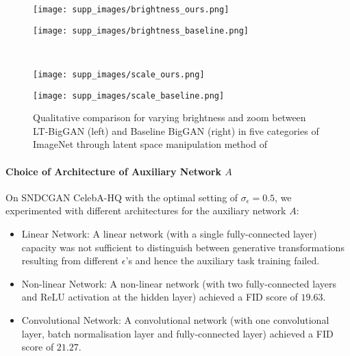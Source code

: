 \documentclass[10pt,twocolumn,letterpaper]{article}
\begin{document}
\begin{figure*}[t]
\centering
    \begin{minipage}{.48\textwidth}
    \texttt{[image: supp\_images/brightness\_ours.png]}
    \end{minipage}\hspace{0.05cm}
    \begin{minipage}{.48\textwidth}
    \texttt{[image: supp\_images/brightness\_baseline.png]}
    \end{minipage}\\
    \begin{minipage}{.48\textwidth}
    \texttt{[image: supp\_images/scale\_ours.png]}
    \end{minipage}\hspace{0.05cm}
    \begin{minipage}{.48\textwidth}
    \texttt{[image: supp\_images/scale\_baseline.png]}
    \end{minipage}
    \caption{\footnotesize{Qualitative comparison for varying brightness and zoom between LT-BigGAN (left) and Baseline BigGAN (right) in five categories of ImageNet through latent space manipulation method of \cite{controlling2020iclr}}}
    \label{fig:lt-biggan_imagenet_scale_zoom}
\end{figure*}

\paragraph{Choice of Architecture of Auxiliary Network $A$}
On SNDCGAN CelebA-HQ with the optimal setting of $\sigma_\epsilon=0.5$, we experimented with different architectures for the auxiliary network $A$:
\begin{itemize}
    \item Linear Network: A linear network (with a single fully-connected layer) capacity was not sufficient to distinguish between generative transformations resulting from different $\epsilon$'s and hence the auxiliary task training failed.
    \noindent
    \vspace{-4pt}
\item Non-linear Network: A non-linear network (with two fully-connected layers and ReLU activation at the hidden layer) achieved a FID score of $19.63$.
\noindent
    \vspace{-6pt}
    \item Convolutional Network: A convolutional network (with one convolutional layer, batch normalisation layer and fully-connected layer) achieved a FID score of $21.27$. 
\end{itemize}
\end{document}
